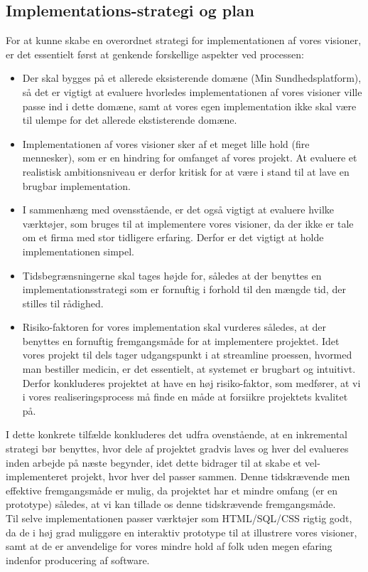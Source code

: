 \subsection{Implementations-strategi og plan}
For at kunne skabe en overordnet strategi for implementationen af vores visioner, er det essentielt først at genkende forskellige aspekter ved processen:
\begin{itemize}
  \item Der skal bygges på et allerede eksisterende domæne (Min Sundhedsplatform), så det er vigtigt at evaluere hvorledes implementationen af vores visioner ville passe ind
    i dette domæne, samt at vores egen implementation ikke skal være til ulempe for det allerede ekstisterende domæne. 
  \item Implementationen af vores visioner sker af et meget lille hold (fire mennesker), som er en hindring for omfanget af vores projekt. At evaluere et realistisk ambitionsniveau er derfor kritisk for at være i stand til at lave en brugbar implementation. 
  \item I sammenhæng med ovensstående, er det også vigtigt at evaluere hvilke værktøjer, som bruges til at implementere vores visioner, da der ikke er tale om et firma med stor tidligere erfaring. Derfor er det vigtigt at holde implementationen simpel.
  \item Tidsbegrænsningerne skal tages højde for, således at der benyttes en implementationsstrategi som er fornuftig i forhold til den mængde tid, der stilles til rådighed.
  \item Risiko-faktoren for vores implementation skal vurderes således, at der benyttes en fornuftig fremgangsmåde for at implementere projektet. Idet vores projekt til dels tager udgangspunkt i at streamline proessen, hvormed man bestiller medicin, er det essentielt, at systemet er brugbart og intuitivt. Derfor konkluderes projektet at have en høj risiko-faktor, som medfører, at vi i vores realiseringsprocess må finde en måde at forsiikre projektets kvalitet på.
\end{itemize}

I dette konkrete tilfælde konkluderes det udfra ovenstående, at en inkremental strategi bør benyttes, hvor dele af projektet gradvis laves og hver del evalueres inden arbejde på næste begynder, idet dette bidrager til at skabe et vel-implementeret projekt, hvor hver del passer sammen. Denne tidskrævende men effektive fremgangsmåde er mulig, da projektet har et mindre omfang (er en prototype) således, at vi kan tillade os denne tidskrævende fremgangsmåde.\\
Til selve implementationen passer værktøjer som HTML/SQL/CSS rigtig godt, da de i høj grad muliggøre en interaktiv prototype til at illustrere vores visioner, samt at de er anvendelige for vores mindre hold af folk uden megen efaring indenfor producering af software.


